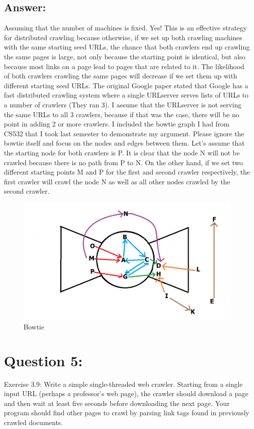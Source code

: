 \documentclass[a4paper, 11pt]{article}
\begin{document}
\subsection*{Answer:}
Assuming that the number of machines is fixed. Yes! This is an effective strategy for distributed crawling because otherwise, if we set up both crawling machines with the same starting seed URLs, the chance that both crawlers end up crawling the same pages is large, not only because the starting point is identical, but also because most links on a page lead to pages that are related to it. The likelihood of both crawlers crawling the same pages will decrease if we set them up with different starting seed URLs. The original Google paper stated that Google has a fast distributed crawling system where a single URLserver serves lists of URLs to a number of crawlers (They ran 3). I assume that the URLserver is not serving the same URLs to all 3 crawlers, because if that was the case, there will be no point in adding 2 or more crawlers. I included the bowtie graph I had from CS532 that I took last semester to demonstrate my argument. Please ignore the bowtie itself and focus on the nodes and edges between them. Let's assume that the starting node for both crawlers is P. It is clear that the node N will not be crawled because there is no path from P to N. On the other hand, if we set two different starting points M and P for the first and second crawler respectively, the first crawler will crawl the node N as well as all other nodes crawled by the second crawler.

\begin{figure}[h]
\caption{Bowtie}
\centering
\includegraphics[scale=0.5]{Q2/bowtie.png}
\end{figure}

\section*{Question 5:}
Exercise 3.9: Write a simple single-threaded web crawler. Starting from a single input URL (perhaps a professor’s web page), the crawler should download a page and then wait at least five seconds before downloading the next page. Your program should find other pages to crawl by parsing link tags found in previously crawled documents.
\end{document}
